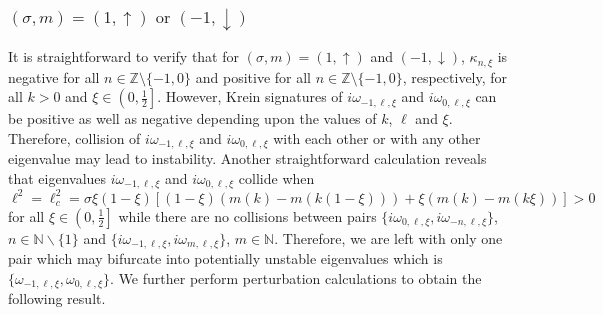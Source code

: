 \documentclass[12pt]{amsart}    %
\renewcommand{\k}{\kappa}
\newcommand{\Z}{\mathbb{Z}}
\newcommand{\N}{\mathbb{N}}
\newcommand{\oneu}{(1,\uparrow)}
\newcommand{\mind}{(-1,\downarrow)}
\numberwithin{equation}{section}
\begin{document}
\subsubsection{$\boxed{(\sigma,m)=\oneu \text{ or } \mind}$}\label{sss:1} It is straightforward to verify that for $(\sigma,m)=\oneu $ and $\mind$, $\k_{n,\xi}$ is  negative for all $n \in \Z\setminus\{-1,0\}$ and positive for all $n \in \Z\setminus\{-1,0\}$, respectively, for all $k>0$ and $\xi\in\left(0,\frac12\right]$. However, Krein signatures of $i\omega_{-1,\ell,\xi}$ and $i\omega_{0,\ell,\xi}$ can be positive as well as negative depending upon the values of $k$, $\ell$ and $\xi$. Therefore, collision of $i\omega_{-1,\ell,\xi}$ and $i\omega_{0,\ell,\xi}$ with each other or with any other eigenvalue may lead to instability. Another straightforward calculation reveals that eigenvalues $i\omega_{-1,\ell,\xi}$ and $i\omega_{0,\ell,\xi}$ collide when
\begin{equation}\label{e:collision}
    \ell^2=\ell^2_c = \sigma \xi(1-\xi)[(1-\xi)(m(k)-m(k(1-\xi)))+\xi(m(k)-m(k\xi))] > 0
\end{equation}
for all $\xi\in\left(0,\frac12\right]$ while there are no collisions between  pairs $\{i\omega_{0,\ell,\xi}, i\omega_{-n,\ell,\xi}\}$, $n\in \N\backslash \{1\}$ and $\{i\omega_{-1,\ell,\xi}, i\omega_{m,\ell,\xi}\}$, $m\in \N$.
Therefore, we are left with only one pair which may bifurcate into potentially unstable eigenvalues which is $\{\omega_{-1,\ell,\xi},\omega_{0,\ell,\xi}\}$. We further perform perturbation calculations to obtain the following result.
\end{document}
